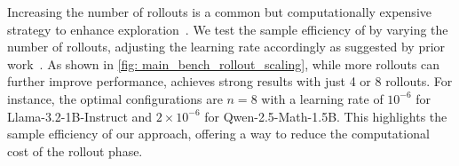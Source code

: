 Increasing the number of rollouts is a common but computationally expensive strategy to enhance exploration~\citep{hou2025t1}. 
%
We test the sample efficiency of \alg by varying the number of rollouts, adjusting the learning rate accordingly as suggested by prior work~\citep{chen2025pass}. 
%
As shown in \cref{fig: main_bench_rollout_scaling}, while more rollouts can further improve performance, \alg achieves strong results with just 4 or 8 rollouts. 
%
For instance, the optimal configurations are $n=8$ with a learning rate of $10^{-6}$ for Llama-3.2-1B-Instruct and $2\times10^{-6}$ for Qwen-2.5-Math-1.5B. 
%
This highlights the sample efficiency of our approach, offering a way to reduce the computational cost of the rollout phase.
%



